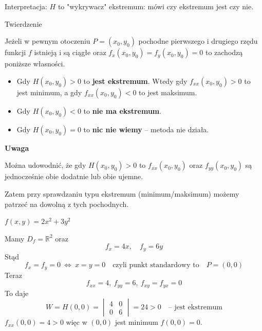 Interpretacja: $H$ to "wykrywacz" ekstremum: mówi czy ekstremum jest czy nie. \\

\begin{tw}{Twierdzenie}

Jeżeli w pewnym otoczeniu $ P = (x_0, y_0) $ pochodne pierwszego i drugiego rzędu funkcji $f$ istnieją i są ciągłe oraz
$ f_x(x_0, y_0) = f_y(x_0, y_0) = 0 $ to zachodzą poniższe własności.

\begin{itemize}
    \item Gdy $ H(x_0, y_0) > 0 $ to \textbf{jest ekstremum}. Wtedy gdy $ f_{xx}(x_0, y_0) > 0 $ to jest minimum,
    a gdy $ f_{xx}(x_0, y_0) < 0 $ to jest maksimum.
    \item Gdy $ H(x_0, y_0) < 0 $ to \textbf{nie ma ekstremum}.
    \item Gdy $ H(x_0, y_0) = 0 $ to \textbf{nic nie wiemy} -- metoda nie działa.
\end{itemize}
\end{tw}

\textbf{Uwaga}

Można udowodnić, że gdy $ H(x_0, y_0) > 0 $ to $ f_{xx}(x_0, y_0) $ oraz $ f_{yy}(x_0, y_0) $ są jednocześnie obie dodatnie
lub obie ujemne.

Zatem przy sprawdzaniu typu ekstremum (minimum/maksimum) możemy patrzeć na dowolną z tych pochodnych. \\

\begin{przyklad}
 $ f(x,y) = 2x^2 + 3y^2 $
    
    Mamy $ D_f = \mathbb{R}^2 $ oraz
    $$ f_x = 4x, \quad f_y = 6y $$
    Stąd
    $$ f_x = f_y = 0 \ \Leftrightarrow \ x = y = 0 \quad \textrm{czyli punkt standardowy to} \quad P = (0,0) $$
    Teraz
    $$ f_{xx} = 4, \ f_{yy} = 6, \ f_{xy} = f_{yx} = 0 $$
    To daje
    $$ W = H(0,0) = \begin{vmatrix} 4 & 0 \\ 0 & 6 \end{vmatrix} = 24 > 0 \quad \textrm{-- jest ekstremum} $$
    $ f_{xx}(0,0) = 4 > 0 $ więc w $(0,0)$ jest minimum $ f(0,0) = 0 $. 
\end{przyklad}

